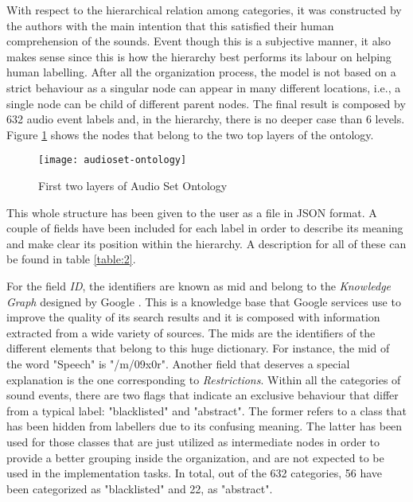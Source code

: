 	With respect to the hierarchical relation among categories, it was constructed by the authors with the main intention that this satisfied their human comprehension of the sounds. Event though this is a subjective manner, it also makes sense since this is how the hierarchy best performs its labour on helping human labelling.
	After all the organization process, the model is not based on a strict behaviour as a singular node can appear in many different locations, i.e., a single node can be child of different parent nodes. The final result is composed by 632 audio event labels and, in the hierarchy, there is no deeper case than 6 levels. Figure \ref{fig:mesh1} shows the nodes that belong to the two top layers of the ontology.
	
	\begin{figure}[h]
		\centering
		\captionsetup{justification=centering}
		\texttt{[image: audioset-ontology]}
		\caption{First two layers of Audio Set Ontology \cite{Gemmeke2017}}
		\label{fig:mesh1}
	\end{figure}
	
	This whole structure has been given to the user as a file in JSON format. A couple of fields have been included for each label in order to describe its meaning and make clear its position within the hierarchy. A description for all of these can be found in table \ref{table:2}. 
	
	For the field \textit{ID}, the identifiers are known as \acrfull{mid} and belong to the \textit{Knowledge Graph} designed by Google \cite{Singhal2012}. This is a knowledge base that Google services use to improve the quality of its search results and it is composed with information extracted from a wide variety of sources. The \acrshort{mid}s are the identifiers of the different elements that belong to this huge dictionary. For instance, the \acrshort{mid} of the word "Speech" is "/m/09x0r". Another field that deserves a special explanation is the one corresponding to \textit{Restrictions}. Within all the categories of sound events, there are two flags that indicate an exclusive behaviour that differ from a typical label: "blacklisted" and "abstract". The former refers to a class that has been hidden from labellers due to its confusing meaning. The latter has been used for those classes that are just utilized as intermediate nodes in order to provide a better grouping inside the organization, and are not expected to be used in the implementation tasks. In total, out of the 632 categories, 56 have been categorized as "blacklisted" and 22, as "abstract".
	
